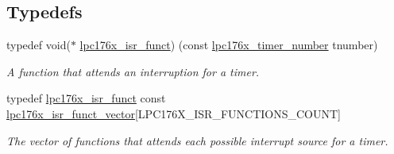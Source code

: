 \subsection*{Typedefs}
\begin{DoxyCompactItemize}
\item 
typedef void($\ast$ \mbox{\hyperlink{timer-defs_8h_a0fc7ef6ba56b5d2439fa6d48f745c9fc}{lpc176x\+\_\+isr\+\_\+funct}}) (const \mbox{\hyperlink{timer-defs_8h_a23c6cc7925b3e04973ecb1cc9f3706d1}{lpc176x\+\_\+timer\+\_\+number}} tnumber)
\begin{DoxyCompactList}\small\item\em A function that attends an interruption for a timer. \end{DoxyCompactList}\item 
\mbox{\label{timer-defs_8h_a3f95ff573f1143546a0076bc064f8e39}} 
typedef \mbox{\hyperlink{timer-defs_8h_a0fc7ef6ba56b5d2439fa6d48f745c9fc}{lpc176x\+\_\+isr\+\_\+funct}} const \mbox{\hyperlink{timer-defs_8h_a3f95ff573f1143546a0076bc064f8e39}{lpc176x\+\_\+isr\+\_\+funct\+\_\+vector}}\mbox{[}L\+P\+C176\+X\+\_\+\+I\+S\+R\+\_\+\+F\+U\+N\+C\+T\+I\+O\+N\+S\+\_\+\+C\+O\+U\+NT\mbox{]}
\begin{DoxyCompactList}\small\item\em The vector of functions that attends each possible interrupt source for a timer. \end{DoxyCompactList}\end{DoxyCompactItemize}
